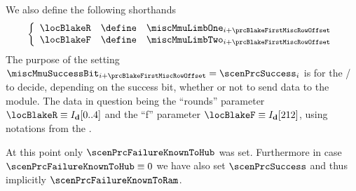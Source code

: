 \begin{description}
\begin{description}
				\saNote{} We also define the following shorthands
				\[
					\left\{ \begin{array}{lcl} \label{hub: instruction handling: call: precompiles: blake: shorthands}
						\locBlakeR & \define & \miscMmuLimbOne _{i + \prcBlakeFirstMiscRowOffset} \\
						\locBlakeF & \define & \miscMmuLimbTwo _{i + \prcBlakeFirstMiscRowOffset} \\
					\end{array} \right.
				\]
				\saNote{}
				The purpose of the setting $\miscMmuSuccessBit _{i + \prcBlakeFirstMiscRowOffset} = \scenPrcSuccess _{i}$ is for the \mmuMod{} / \mmioMod{} to decide, depending on the success bit, whether or not to send data to the \blakeDataMod{} module.
				The data in question being the ``rounds'' parameter $\locBlakeR \equiv I_\textbf{d}[0..4]$ and the ``f'' parameter $\locBlakeF \equiv I_\textbf{d}[212]$, using notations from the \cite{EYP-London}.

				\saNote{}
				At this point only $\scenPrcFailureKnownToHub$ was set.
				Furthermore in case $\scenPrcFailureKnownToHub \equiv 0$ we have also set $\scenPrcSuccess$ and thus implicitly $\scenPrcFailureKnownToRam$.
		\end{description}
	\end{description}
